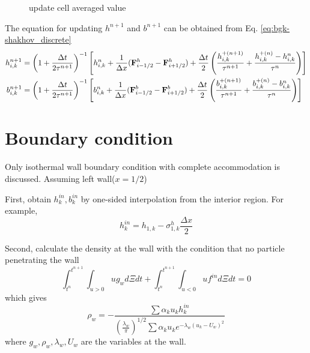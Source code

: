 \documentclass[a4paper]{book}
\begin{document}
\begin{figure}[htb!]
    \centering
    \caption{update cell averaged value}
    \label{pic:update}
\end{figure}

The equation for updating $h^{n+1}$ and $b^{n+1}$ can be obtained from Eq. \ref{eq:bgk-shakhov_discrete}
$$
\begin{aligned}
    h_{i,k}^{n+1} &= \left(1+\frac{\Delta t}{2\tau^{n+1}}\right)^{-1}\left[h_{i,k}^n+\frac{1}{\Delta x}({\bf F}_{i-1/2}^h-{\bf F}_{i+1/2}^h)+\frac{\Delta t}{2}\left(\frac{h_{i,k}^{+(n+1)}}{\tau^{n+1}}+\frac{h_{i,k}^{+(n)}-h_{i,k}^n}{\tau^n}\right)\right]\\
    b_{i,k}^{n+1} &= \left(1+\frac{\Delta t}{2\tau^{n+1}}\right)^{-1}\left[b_{i,k}^n+\frac{1}{\Delta x}({\bf F}_{i-1/2}^b-{\bf F}_{i+1/2}^b)+\frac{\Delta t}{2}\left(\frac{b_{i,k}^{+(n+1)}}{\tau^{n+1}}+\frac{b_{i,k}^{+(n)}-b_{i,k}^n}{\tau^n}\right)\right]\\
\end{aligned} 
$$

\section{Boundary condition}
Only isothermal wall boundary condition with complete accommodation is discussed. Assuming left wall($x=1/2$)

First, obtain $h_k^{in},b_k^{in}$ by one-sided interpolation from the interior region. For example,
$$h_{k}^{in} = h_{1,k}-\sigma_{1,k}^h\frac{\Delta x}{2}$$

Second, calculate the density at the wall with the condition that no particle penetrating the wall
$$\int_{t^n}^{t^{n+1}}\int_{u>0} ug_w d\Xi dt+\int_{t^n}^{t^{n+1}}\int_{u<0} uf^{in}d\Xi dt=0$$
which gives
$$\rho_w = -\frac{\sum\alpha_k u_k h_k^{in}}{\left(\frac{\lambda_w}{\pi}\right)^{1/2}\sum\alpha_k u_k e^{-\lambda_w(u_k-U_w)^2}}$$
where $g_w,\rho_w,\lambda_w,U_w$ are the variables at the wall.
\end{document}
